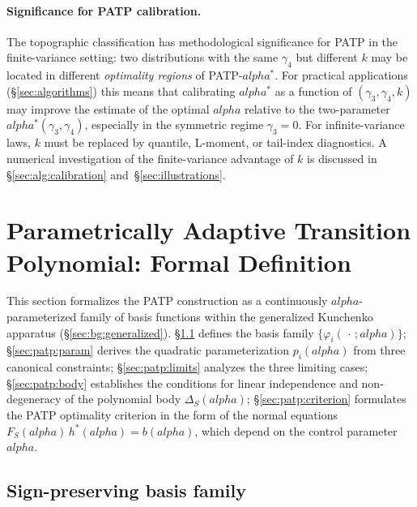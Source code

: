 \documentclass[11pt]{article}
\def\alpha{alpha}%
\def\vec#1{#1}%
\def\mathbf#1{#1}%
\theoremstyle{definition}
\begin{document}
\paragraph{Significance for PATP calibration.}
The topographic classification has methodological significance for PATP in
the finite-variance setting: two distributions with the same $\gamma_4$ but
different $k$ may be located in different \emph{optimality regions} of
PATP-$\alpha^{*}$. For practical applications (\S\ref{sec:algorithms}) this
means that calibrating $\alpha^{*}$ as a function of
$(\gamma_3, \gamma_4, k)$ may improve the estimate of the optimal $\alpha$
relative to the two-parameter $\alpha^{*}(\gamma_3, \gamma_4)$, especially in
the symmetric regime $\gamma_3 = 0$. For infinite-variance laws, $k$ must be
replaced by quantile, L-moment, or tail-index diagnostics. A numerical
investigation of the finite-variance advantage of $k$ is discussed in
\S\ref{sec:alg:calibration} and~\S\ref{sec:illustrations}.


\section{Parametrically Adaptive Transition Polynomial: Formal Definition}\label{sec:patp}

This section formalizes the PATP construction as a continuously
$\alpha$-parameterized family of basis functions within the generalized
Kunchenko apparatus (\S\ref{sec:bg:generalized}). \S\ref{sec:patp:family}
defines the basis family $\{\varphi_i(\,\cdot\,;\alpha)\}$;
\S\ref{sec:patp:param} derives the quadratic parameterization $p_i(\alpha)$
from three canonical constraints; \S\ref{sec:patp:limits} analyzes the three
limiting cases; \S\ref{sec:patp:body} establishes the conditions for linear
independence and non-degeneracy of the polynomial body $\Delta_S(\alpha)$;
\S\ref{sec:patp:criterion} formulates the PATP optimality criterion in the
form of the normal equations
$\mathbf{F}_S(\alpha)\,\vec h^{*}(\alpha) = \vec b(\alpha)$, which depend
on the control parameter~$\alpha$.

\subsection{Sign-preserving basis family}\label{sec:patp:family}
\end{document}
